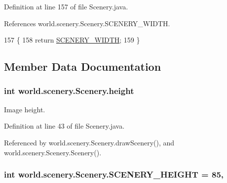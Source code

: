 Definition at line 157 of file Scenery.\-java.



References world.\-scenery.\-Scenery.\-S\-C\-E\-N\-E\-R\-Y\-\_\-\-W\-I\-D\-T\-H.


\begin{DoxyCode}
157                                         \{
158         \textcolor{keywordflow}{return} \hyperlink{a00024_affb047c028883c6d069a03ef0f1caeb8}{SCENERY\_WIDTH};
159     \}
\end{DoxyCode}


\subsection{Member Data Documentation}
\hypertarget{a00024_a54b4edfa060087e78a829105bf62a900}{
\subsubsection[{height}]{\setlength{\rightskip}{0pt plus 5cm}int world.\-scenery.\-Scenery.\-height\hspace{0.3cm}{\ttfamily [protected]}}}\label{a00024_a54b4edfa060087e78a829105bf62a900}


Image height. 



Definition at line 43 of file Scenery.\-java.



Referenced by world.\-scenery.\-Scenery.\-draw\-Scenery(), and world.\-scenery.\-Scenery.\-Scenery().

\hypertarget{a00024_a106e53ae6e1647395740237ccce7f363}{
\subsubsection[{S\-C\-E\-N\-E\-R\-Y\-\_\-\-H\-E\-I\-G\-H\-T}]{\setlength{\rightskip}{0pt plus 5cm}int world.\-scenery.\-Scenery.\-S\-C\-E\-N\-E\-R\-Y\-\_\-\-H\-E\-I\-G\-H\-T = 85\hspace{0.3cm}{\ttfamily [static]}, {\ttfamily [protected]}}}\label{a00024_a106e53ae6e1647395740237ccce7f363}


